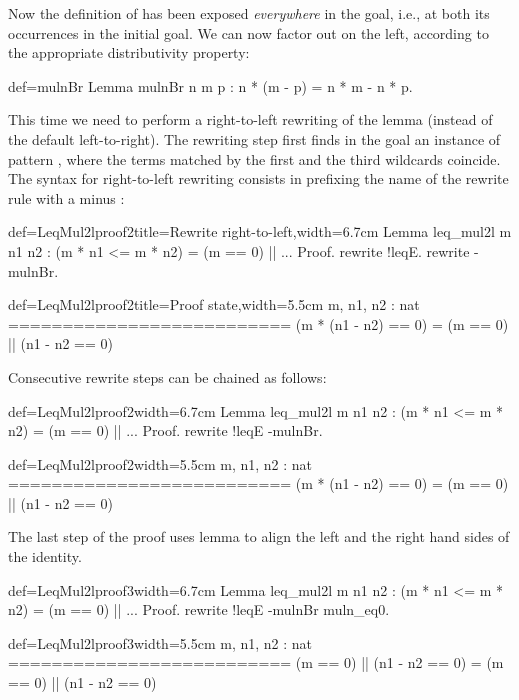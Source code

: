Now the definition of \C{<=} has been exposed
\emph{everywhere} in the goal, i.e., at both its occurrences in the
initial goal. We can now factor out  on the left, according to the
appropriate distributivity property:

\begin{coq}{def=mulnBr}{}
Lemma mulnBr n m p : n * (m - p) = n * m - n * p.
\end{coq}

This time we need to perform a right-to-left rewriting of the
 lemma (instead of the
default left-to-right). The rewriting step first finds in the goal an
instance of pattern \C{(_ * _ - _ * _)}, where the terms matched by
the first and the third wildcards coincide. The syntax for
right-to-left rewriting consists in prefixing the
name of the rewrite rule
with a minus \C{-}:


\begin{coq}{def=LeqMul2lproof2}{title=Rewrite right-to-left,width=6.7cm}
Lemma leq_mul2l m n1 n2 :
 (m * n1 <= m * n2) = (m == 0) || ...
Proof.
rewrite !leqE. rewrite -mulnBr.
\end{coq}
\begin{coqout}{def=LeqMul2lproof2}{title=Proof state,width=5.5cm}
m, n1, n2 : nat
==========================
(m * (n1 - n2) == 0) =
  (m == 0) || (n1 - n2 == 0)
\end{coqout}
Consecutive rewrite steps can be chained as follows:

\begin{coq}{def=LeqMul2lproof2}{width=6.7cm}
Lemma leq_mul2l m n1 n2 :
 (m * n1 <= m * n2) = (m == 0) || ...
Proof.
rewrite !leqE -mulnBr.
\end{coq}
\begin{coqout}{def=LeqMul2lproof2}{width=5.5cm}
m, n1, n2 : nat
==========================
(m * (n1 - n2) == 0) =
  (m == 0) || (n1 - n2 == 0)
\end{coqout}
The last step of the proof uses lemma  to align the left
and the right hand sides of the identity.

\begin{coq}{def=LeqMul2lproof3}{width=6.7cm}
Lemma leq_mul2l m n1 n2 :
 (m * n1 <= m * n2) = (m == 0) || ...
Proof.
rewrite !leqE -mulnBr muln_eq0.
\end{coq}
\begin{coqout}{def=LeqMul2lproof3}{width=5.5cm}
m, n1, n2 : nat
==========================
(m == 0) || (n1 - n2 == 0) =
  (m == 0) || (n1 - n2 == 0)
\end{coqout}

